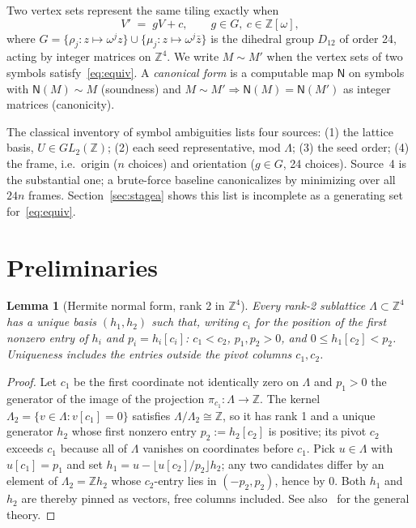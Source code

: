 \documentclass[11pt]{article}
\newtheorem{lemma}[theorem]{Lemma}
\theoremstyle{definition}
\newcommand{\Zw}{\mathbb{Z}[\omega]}
\newcommand{\Z}{\mathbb{Z}}
\newcommand{\Lam}{\Lambda}
\newcommand{\N}{\mathsf{N}}
\begin{document}
Two vertex sets represent the same tiling exactly when
\begin{equation}\label{eq:equiv}
  V' \;=\; gV+c,\qquad g\in G,\ c\in\Zw,
\end{equation}
where $G=\{\rho_j\colon z\mapsto\omega^j z\}\cup\{\mu_j\colon z\mapsto\omega^j\bar z\}$ is
the dihedral group $D_{12}$ of order 24, acting by integer matrices on $\Z^4$. We write
$M\sim M'$ when the vertex sets of two symbols satisfy~\eqref{eq:equiv}. A \emph{canonical
form} is a computable map $\N$ on symbols with $\N(M)\sim M$ (soundness) and
$M\sim M'\Rightarrow \N(M)=\N(M')$ as integer matrices (canonicity).

The classical inventory of symbol ambiguities lists four sources: (1) the lattice basis,
$U\in GL_2(\Z)$; (2) each seed representative, mod $\Lam$; (3) the seed order; (4) the frame,
i.e.\ origin ($n$ choices) and orientation ($g\in G$, 24 choices). Source~4 is the
substantial one; a brute-force baseline canonicalizes by minimizing over all $24n$ frames.
Section~\ref{sec:stagea} shows this list is incomplete as a generating set
for~\eqref{eq:equiv}.

\section{Preliminaries}\label{sec:prelim}

\begin{lemma}[Hermite normal form, rank 2 in $\Z^4$]\label{lem:hnf}
Every rank-2 sublattice $\Lam\subset\Z^4$ has a unique basis $(h_1,h_2)$ such that, writing
$c_i$ for the position of the first nonzero entry of $h_i$ and $p_i=h_i[c_i]$: $c_1<c_2$,
$p_1,p_2>0$, and $0\le h_1[c_2]<p_2$. Uniqueness includes the entries outside the pivot
columns $c_1,c_2$.
\end{lemma}

\begin{proof}
Let $c_1$ be the first coordinate not identically zero on $\Lam$ and $p_1>0$ the generator
of the image of the projection $\pi_{c_1}\colon\Lam\to\Z$. The kernel
$\Lam_2=\{v\in\Lam: v[c_1]=0\}$ satisfies $\Lam/\Lam_2\cong\Z$, so it has rank 1 and a
unique generator $h_2$ whose first nonzero entry $p_2:=h_2[c_2]$ is positive; its pivot
$c_2$ exceeds $c_1$ because all of $\Lam$ vanishes on coordinates before $c_1$. Pick
$u\in\Lam$ with
$u[c_1]=p_1$ and set $h_1=u-\lfloor u[c_2]/p_2\rfloor h_2$; any two candidates differ by an
element of $\Lam_2=\Z h_2$ whose $c_2$-entry lies in $(-p_2,p_2)$, hence by $0$. Both $h_1$
and $h_2$ are thereby pinned as vectors, free columns included. See
also~\cite[\S2.4]{cohen1993} for the general theory.
\end{proof}
\end{document}
